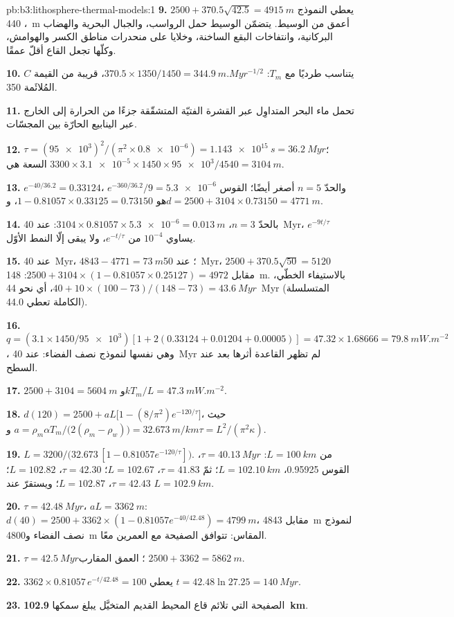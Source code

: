 \begin{solution}{pb:b3:lithosphere-thermal-models:1}
\textbf{9.} يعطي النموذج $2500 + 370.5\sqrt{42.5} = \qty{4915}{m}$،
\qty{440}{m} أعمق من الوسيط. يتضمّن الوسيط حمل
الرواسب، والجبال البحرية والهضاب البركانية، وانتفاخات البقع الساخنة،
وخلايا على منحدرات مناطق الكسر والهوامش، وكلّها تجعل القاع
أقلّ عمقًا.

\textbf{10.} $C$ يتناسب طرديًا مع $T_m$: $370.5\times1350/1450 =
\qty{344.9}{m.Myr^{-1/2}}$، قريبة من القيمة المُلائَمة 350.

\textbf{11.} تحمل ماء البحر المتداوِل عبر القشرة الفتيّة المتشقّقة جزءًا
من الحرارة إلى الخارج عبر الينابيع الحارّة بين المجسّات.

\textbf{12.} $\tau = (\num{95e3})^2/(\pi^2\times\num{0.8e-6}) =
\qty{1.143e15}{s} = \qty{36.2}{Myr}$؛ السعة هي $3300\times
\num{3.1e-5}\times1450\times\num{95e3}/4540 = \qty{3104}{m}$.

\textbf{13.} $e^{-40/36.2} = 0.33124$، $e^{-360/36.2}/9 = \num{5.3e-6}$
والحدّ $n = 5$ أصغر أيضًا؛ القوس هو $1 - 0.81057\times0.33125 =
0.73150$، و$d = 2500 + 3104\times0.73150 = \qty{4771}{m}$.

\textbf{14.} بالحدّ $n = 3$، $3104\times0.81057\times\num{5.3e-6} =
\qty{0.013}{m}$: عند \qty{40}{Myr}، $e^{-9t/\tau}$ يساوي $10^{-4}$ من
$e^{-t/\tau}$، ولا يبقى إلّا النمط الأوّل.

\textbf{15.} عند \qty{40}{Myr}، $4843 - 4771 = \qty{73}{m}$؛ عند
\qty{50}{Myr}، $2500 + 370.5\sqrt{50} = 5120$ مقابل $2500 + 3104\times(1 -
0.81057\times0.25127) = 4972$: \qty{148}{m}. بالاستيفاء الخطّي، $40 + 10\times
(100 - 73)/(148 - 73) = \qty{43.6}{Myr}$، أي نحو \qty{44}{Myr} (المتسلسلة الكاملة
تعطي 44.0).

\textbf{16.} $q = (3.1\times1450/\num{95e3})[1 + 2(0.33124 + 0.01204 +
0.00005)] = 47.32\times1.68666 = \qty{79.8}{mW.m^{-2}}$، وهي نفسها
لنموذج نصف الفضاء: عند \qty{40}{Myr} لم تظهر القاعدة أثرها بعد
عند السطح.

\textbf{17.} $2500 + 3104 = \qty{5604}{m}$ و$kT_m/L = \qty{47.3}{mW.m^{-2}}$.

\textbf{18.} $d(120) = 2500 + aL\bigl[1 - (8/\pi^2)e^{-120/\tau}\bigr]$، حيث
$a = \rho_m\alpha T_m/\bigl(2(\rho_m - \rho_w)\bigr) = \qty{32.673}{m/km}$
و$\tau = L^2/(\pi^2\kappa)$.

\textbf{19.} $L = 3200/\bigl(32.673\,[1 - 0.81057e^{-120/\tau}]\bigr)$.
من $L = \qty{100}{km}$: $\tau = \qty{40.13}{Myr}$، القوس 0.95925، $L =
\qty{102.10}{km}$؛ ثمّ $\tau = 41.83$، $L = 102.67$؛ $\tau = 42.30$، $L =
102.82$؛ $\tau = 42.43$، $L = 102.87$؛ ويستقرّ عند $L = \qty{102.9}{km}$.

\textbf{20.} $\tau = \qty{42.48}{Myr}$، $aL = \qty{3362}{m}$: $d(40) = 2500 +
3362\times(1 - 0.81057e^{-40/42.48}) = \qty{4799}{m}$، مقابل \qty{4843}{m}
لنموذج نصف الفضاء و\qty{4800}{m} المقاس: تتوافق الصفيحة مع العمرين معًا.

\textbf{21.} $\tau = \qty{42.5}{Myr}$؛ العمق المقارب $2500 + 3362 =
\qty{5862}{m}$.

\textbf{22.} $3362\times0.81057\,e^{-t/42.48} = 100$ يعطي $t = 42.48\ln27.25 =
\qty{140}{Myr}$.

\textbf{23.} الصفيحة التي تلائم قاع المحيط القديم المتخيَّل
يبلغ سمكها \textbf{\qty[text-series-to-math=true]{102.9}{km}}.
\end{solution}
